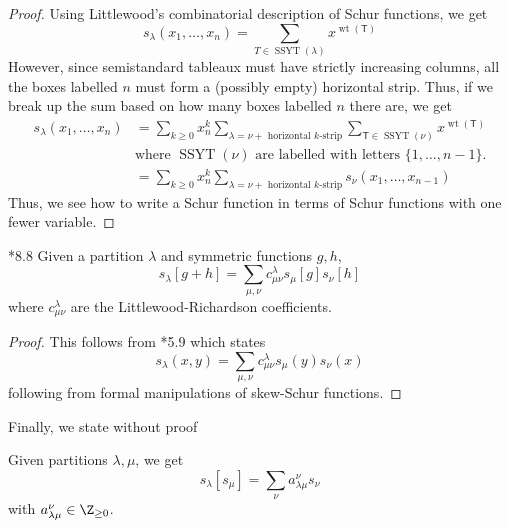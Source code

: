 \documentclass[11pt,leqno,oneside]{amsart}
\numberwithin{thm}{section}
\newcommand{\T}{\mathsf{T}}
\newcommand{\wt}{\operatorname{wt}}
\newcommand{\SSYT}{\operatorname{SSYT}}
\begin{document}
\begin{proof}
  Using Littlewood's combinatorial description of Schur functions, we
  get \[
    s_\lambda(x_1,\ldots,x_n) = \sum_{T \in \SSYT(\lambda)}
    x^{\wt(\T)}
  \]
  However, since semistandard tableaux must have strictly increasing
  columns, all the boxes labelled \(n\) must form a (possibly empty)
  horizontal strip. Thus, if we break up the sum based on how many
  boxes labelled \(n\) there are, we get
  \begin{align*}
    s_\lambda(x_1, \ldots, x_n)
    & = \sum_{k \geq 0} x_n^k \sum_{\lambda
      = \nu + \text{ horizontal }k\text{-strip}} \sum_{\T \in
      \SSYT(\nu)} x^{\wt(\T)} \\
    & \text{where } \SSYT(\nu) \text{ are labelled with letters
                                } \{1,\ldots,n-1\}. 
 \\
    & = \sum_{k \geq 0} x_n^k \sum_{\lambda
      = \nu + \text{ horizontal }k\text{-strip}} s_\nu(x_1,\ldots,x_{n-1})
  \end{align*}
  Thus, we see how to write a Schur function in terms of Schur
  functions with one fewer variable.
\end{proof}
\begin{prop}
  \cite{macdonald}*{8.8} Given a partition \(\lambda\) and symmetric functions \(g,h\), \[
    s_\lambda[g+h] = \sum_{\mu,\nu} c_{\mu \nu}^{\lambda} s_\mu[g] s_\nu[h]
  \]
  where \(c_{\mu \nu}^{\lambda}\) are the Littlewood-Richardson
  coefficients. 
\end{prop}
\begin{proof}
  This follows from \cite{macdonald}*{5.9} which states \[
    s_\lambda(x,y) = \sum_{\mu,\nu} c_{\mu \nu}^{\lambda} s_\mu(y) s_\nu(x)
  \]
  following from formal manipulations of skew-Schur functions.
\end{proof}
Finally, we state without proof
\begin{thm}
  Given partitions \(\lambda,\mu\), we get \[
    s_\lambda[s_\mu] = \sum_{\nu} a_{\lambda \mu}^{\nu} s_\nu
  \]
  with \(a_{\lambda \mu}^{\nu} \in \Z_{\geq 0}\).
\end{thm}
\end{document}
